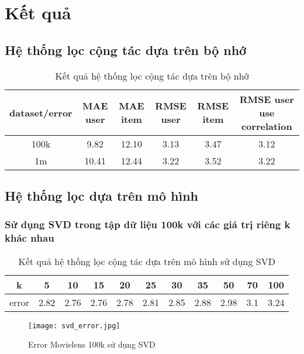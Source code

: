 \chapter{Kết quả}
\section{Hệ thống lọc cộng tác dựa trên bộ nhớ}
\begin{table}[H]
\caption{Kết quả hệ thống lọc cộng tác dựa trên bộ nhớ}
\label{table:3}
\begin{center}
\begin{tabular}{|c|c|c|c|c|c|}
\hline 
dataset/error & MAE user & MAE item & RMSE user & RMSE item & RMSE user use correlation \\ 
\hline 
100k & 9.82 & 12.10 & 3.13 & 3.47 & 3.12 \\ 
\hline 
1m & 10.41 & 12.44 & 3.22 & 3.52 & 3.22 \\ 
\hline 
\end{tabular}
\end{center}
\end{table}

\section{Hệ thống lọc dựa trên mô hình}
\subsection{Sử dụng SVD trong tập dữ liệu 100k với các giá trị riêng k khác nhau}
\begin{table}[H]
\caption{Kết quả hệ thống lọc cộng tác dựa trên mô hình sử dụng SVD}
\label{table:4}
\begin{center}
\begin{tabular}{|c|c|c|c|c|c|c|c|c|c|c|}
\hline 
k & 5 & 10 & 15 & 20 & 25 & 30 & 35 & 50 & 70 & 100 \\ 
\hline 
error & 2.82 & 2.76 & 2.76 & 2.78 & 2.81 & 2.85 & 2.88 & 2.98 & 3.1 & 3.24 \\ 
\hline 
\end{tabular}
\end{center}
\end{table}

\begin{center}
\begin{figure}[H]
	\centering
	\texttt{[image: svd\_error.jpg]}
	\caption{Error Movielens 100k sử dụng SVD}
	\label{fig:SVD for Movielens 100k}
\end{figure}
\end{center}